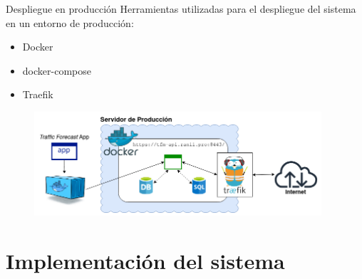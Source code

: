 \documentclass[aspectratio=169,xcolor=dvipsnames]{beamer}
\begin{document}
	
	\begin{frame}{Despliegue en producción}
		Herramientas utilizadas para el despliegue del sistema en un entorno de producción:
		
		\begin{itemize}
			\item Docker
			\item docker-compose
			\item Traefik	
		\end{itemize}
	
		\begin{figure}[h!]
			\begin{center}
				\includegraphics[width=0.95\textwidth]{diag/produccion_tfm.png}
			\end{center}
		\end{figure}
	\end{frame}
	
	
	\section{Implementación del sistema}
	
\end{document}
